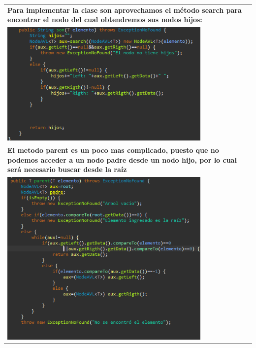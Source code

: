 \documentclass[9pt]{article}
\begin{document}
\begin{longtable}{|p{15cm}|}
		\textbf{Para implementar la clase son aprovechamos el método search para encontrar el nodo del cual obtendremos sus nodos hijos:}  \\
		\includegraphics[width=0.8\textwidth,keepaspectratio]{img/metodoSon.png}\\
		\textbf{El metodo parent es un poco mas complicado, puesto que no podemos acceder a un nodo padre desde un nodo hijo, por lo cual será necesario buscar desde la raíz}  \\
		\includegraphics[width=0.8\textwidth,keepaspectratio]{img/metodoParent.png}\\
	
		\hline
	\end{longtable}
\end{document}
